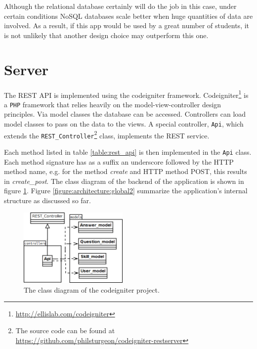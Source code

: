 Although the relational database certainly will do the job in this case, under certain conditions NoSQL databases scale better when huge quantities of data are involved. As a result, if this app would be used by a great number of students, it is not unlikely that another design choice may outperform this one.



\section{Server}

The REST API is implemented using the codeigniter framework. Codeigniter\footnote{\url{http://ellislab.com/codeigniter}} is a \texttt{PHP} framework that relies heavily on the model-view-controller design principles. Via model classes the database can be accessed. Controllers can load model classes to pass on the data to the views. A special controller, \texttt{Api}, which extends the \texttt{REST\_Controller}\footnote{The source code can be found at \url{https://github.com/philsturgeon/codeigniter-restserver}} class, implements the REST service.

Each method listed in table \ref{table:rest_api} is then implemented in the \texttt{Api} class. Each method signature has as a suffix an underscore followed by the HTTP method name, e.g. for the method \emph{create} and HTTP method POST, this results in \emph{create\_post}. The class diagram of the backend of the application is shown in figure \ref{figure:codeigniter:classdiagram}. Figure \ref{figure:architecture:global2} summarize the application's internal structure as discussed so far.

\begin{figure}
	\begin{center}
		\includegraphics[width=200px]{img/codeigniter_class_diagram}
		\caption{The class diagram of the codeigniter project.}
		\label{figure:codeigniter:classdiagram}
	\end{center}
\end{figure}


